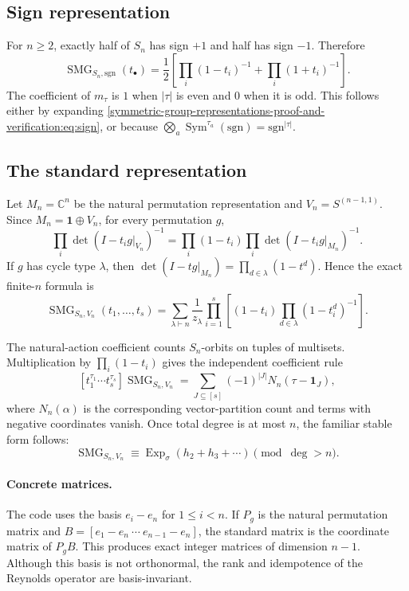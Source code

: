 \documentclass[10pt]{article}
\newcommand{\Sym}{\operatorname{Sym}}
\newcommand{\SMG}{\operatorname{SMG}}
\newcommand{\MGF}{\SMG}
\begin{document}
\subsection{Sign representation}
For $n\geq2$, exactly half of $S_n$ has sign $+1$ and half has sign $-1$.
Therefore
\begin{equation}
 \boxed{\displaystyle
 \MGF_{S_n,\mathrm{sgn}}(t_\bullet)=\frac12\left[
   \prod_i(1-t_i)^{-1}+\prod_i(1+t_i)^{-1}\right].}
 \label{symmetric-group-representations-proof-and-verification:eq:sign}
\end{equation}
The coefficient of $m_\tau$ is $1$ when $|\tau|$ is even and $0$ when it is
odd.  This follows either by expanding \eqref{symmetric-group-representations-proof-and-verification:eq:sign}, or because
$\bigotimes_a\Sym^{\tau_a}(\mathrm{sgn})=\mathrm{sgn}^{|\tau|}$.

\subsection{The standard representation}
Let $M_n=\mathbb C^n$ be the natural permutation representation and
$V_n=S^{(n-1,1)}$.  Since $M_n=\mathbf1\oplus V_n$, for every permutation
$g$,
\[
 \prod_i\det(I-t_i g|_{V_n})^{-1}
 =\prod_i(1-t_i)\prod_i\det(I-t_i g|_{M_n})^{-1}.
\]
If $g$ has cycle type $\lambda$, then
$\det(I-tg|_{M_n})=\prod_{d\in\lambda}(1-t^d)$.  Hence the exact finite-$n$
formula is
\begin{equation}
 \boxed{\displaystyle
 \MGF_{S_n,V_n}(t_1,\ldots,t_s)=
 \sum_{\lambda\vdash n}\frac1{z_\lambda}
 \prod_{i=1}^s\left[(1-t_i)
    \prod_{d\in\lambda}(1-t_i^d)^{-1}\right].}
 \label{symmetric-group-representations-proof-and-verification:eq:standardfinite}
\end{equation}

The natural-action coefficient counts $S_n$-orbits on tuples of multisets.
Multiplication by $\prod_i(1-t_i)$ gives the independent coefficient rule
\[
 [t_1^{\tau_1}\cdots t_s^{\tau_s}]\MGF_{S_n,V_n}
 =\sum_{J\subseteq[s]}(-1)^{|J|}
 N_n(\tau-\mathbf1_J),
\]
where $N_n(\alpha)$ is the corresponding vector-partition count and terms with
negative coordinates vanish.  Once total degree is at most $n$, the familiar
stable form follows:
\[
 \MGF_{S_n,V_n}\equiv
 \operatorname{Exp}_\sigma(h_2+h_3+\cdots)\pmod{\deg>n}.
\]

\paragraph{Concrete matrices.}
The code uses the basis $e_i-e_n$ for $1\leq i<n$.  If $P_g$ is the natural
permutation matrix and $B=[e_1-e_n\ \cdots\ e_{n-1}-e_n]$, the standard matrix
is the coordinate matrix of $P_gB$.  This produces exact integer matrices of
dimension $n-1$.  Although this basis is not orthonormal, the rank and
idempotence of the Reynolds operator are basis-invariant.
\end{document}

